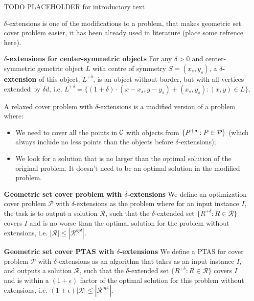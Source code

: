 TODO PLACEHOLDER for introductory text

$\delta$-extensions is one of the
modifications to a problem, that makes geometric set cover problem easier,
it has been already used in literature (place some refrence here).

\begin{defi}\textbf{$\delta$-extensions for center-symmetric objects}
For any $\delta > 0$ and center-symmetric gemetric object $L$ with
centre of symmetry $S = (x_s, y_s)$,
a \textbf{$\delta$-extension} of this object, $L^{+\delta}$,
is an object without border, but with all vertices extended by $\delta d$,
i.e. $ L^{+\delta} =
\{(1 + \delta)\cdot(x - x_s, y - y_s) + (x_s, y_s) : (x, y) \in L\}$.
\end{defi}


A relaxed cover problem with $\delta$-extensions
is a modified version of a problem where:
\begin{itemize}
\item We need to cover all the points in $\mathcal{C}$
with objects from $\{P^{+\delta} : P \in \mathcal{P}\}$ (which always 
include no less points than the objects
before $\delta$-extensions);
\item We look for a solution that is no larger than the optimal solution
of the original problem. It doesn't need to be an optimal solution in
the modified problem.
\end{itemize}


\begin{defi}\textbf{Geometric set cover problem with $\delta$-extensions}
We define an optimization cover problem $\mathcal{P}$
with $\delta$-extensions as the problem where for an input instance $I$,
the task is to output a solution $\mathcal{R}$,
such that the $\delta$-extended set
$\{ R^{+\delta} :  R \in \mathcal{R} \}$ covers $I$
and is no worse than the optimal solution for the problem without
extensions, i.e. $|\mathcal{R}| \le |\mathcal{R}^{opt}|$.
\end{defi}


\begin{defi}\textbf{Geometric set cover PTAS with $\delta$-extensions}
We define a PTAS for cover problem $\mathcal{P}$
with $\delta$-extensions as an algorithm that
takes as an input instance $I$,
and outputs a solution $\mathcal{R}$, such that the $\delta$-extended set
$\{ R^{+\delta} :  R \in \mathcal{R} \}$ covers $I$
and is within a $(1+\epsilon)$ factor of the optimal
solution for this problem without
extensions, i.e. $(1+\epsilon)|\mathcal{R}| \le |\mathcal{R}^{opt}|$.

\end{defi}
